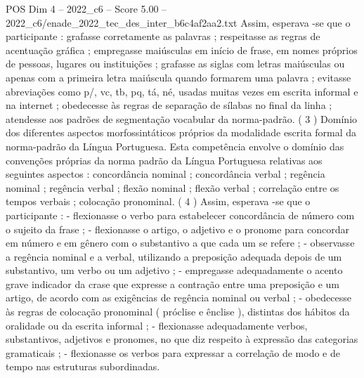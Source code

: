 \begin{textsample}{POS Dim 4 – 2022\_c6 – Score 5.00 – 2022\_c6/enade\_2022\_tec\_des\_inter\_b6c4af2aa2.txt}
Assim, esperava -se que o participante : grafasse corretamente as palavras ; respeitasse as regras de acentuação gráfica ; empregasse maiúsculas em início de frase, em nomes próprios de pessoas, lugares ou instituições ; grafasse as siglas com letras maiúsculas ou apenas com a primeira letra maiúscula quando formarem uma palavra ; evitasse abreviações como p/, vc, tb, pq, tá, né, usadas muitas vezes em escrita informal e na internet ; obedecesse às regras de separação de sílabas no final da linha ; atendesse aos padrões de segmentação vocabular da norma-padrão. ( 3 ) Domínio dos diferentes aspectos morfossintáticos próprios da modalidade escrita formal da norma-padrão da Língua Portuguesa.
Esta competência envolve o domínio das convenções próprias da norma padrão da Língua Portuguesa relativas aos seguintes aspectos : concordância nominal ; concordância verbal ; regência nominal ; regência verbal ; flexão nominal ; flexão verbal ; correlação entre os tempos verbais ; colocação pronominal. ( 4 ) Assim, esperava -se que o participante : - flexionasse o verbo para estabelecer concordância de número com o sujeito da frase ; - flexionasse o artigo, o adjetivo e o pronome para concordar em número e em gênero com o substantivo a que cada um se refere ; - observasse a regência nominal e a verbal, utilizando a preposição adequada depois de um substantivo, um verbo ou um adjetivo ; - empregasse adequadamente o acento grave indicador da crase que expresse a contração entre uma preposição e um artigo, de acordo com as exigências de regência nominal ou verbal ; - obedecesse às regras de colocação pronominal ( próclise e ênclise ), distintas dos hábitos da oralidade ou da escrita informal ; - flexionasse adequadamente verbos, substantivos, adjetivos e pronomes, no que diz respeito à expressão das categorias gramaticais ; - flexionasse os verbos para expressar a correlação de modo e de tempo nas estruturas subordinadas.

\end{textsample}
